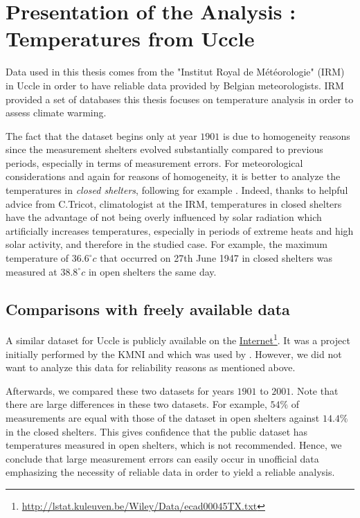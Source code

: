 \section{Presentation of the Analysis : Temperatures from Uccle}\label{sec:presuccle}

Data used in this thesis comes from the "Institut Royal de Météorologie" (IRM) in Uccle in order to have reliable data provided by Belgian meteorologists.
IRM provided a set of databases this thesis focuses on temperature analysis in order to assess climate warming.%

The fact that the dataset begins only at year $1901$ is due to homogeneity reasons since the measurement shelters evolved substantially compared to previous periods, especially in terms of measurement errors. 
For meteorological considerations and again for reasons of homogeneity, it is better to analyze the temperatures in \emph{closed shelters}, following for example \citet{lindsey_use_1956}. Indeed, thanks to helpful advice from C.Tricot, climatologist at the IRM, temperatures in closed shelters have the advantage of not being overly influenced by solar radiation which artificially increases temperatures, especially in periods of extreme heats and high solar activity, and therefore in the studied case. 
For example, the maximum temperature of $36.6^{\circ}c$ that occurred on 27th June 1947 in closed shelters was measured at $38.8^{\circ}c$ in open shelters the same day.



\subsection*{Comparisons with freely available data} 

A similar dataset for Uccle is publicly available on the \href{http://lstat.kuleuven.be/Wiley/Data/ecad00045TX.txt}{Internet}\footnote{\url{http://lstat.kuleuven.be/Wiley/Data/ecad00045TX.txt}}. It was a project initially performed by the KMNI and which was used by \citet{beirlant_statistics_2006}. However, we did not want to analyze this data for reliability reasons as mentioned above.

Afterwards, we compared these two datasets for years $1901$ to $2001$. Note that there are large differences
in these two datasets. For example,
$54\%$ of measurements are equal with those of the dataset in open shelters against $14.4\%$ in the closed shelters. This gives confidence that the public dataset has temperatures measured in open shelters, which is not recommended. Hence, we conclude that large measurement errors can easily occur in unofficial data emphasizing the necessity of reliable data in order to yield a reliable analysis.

